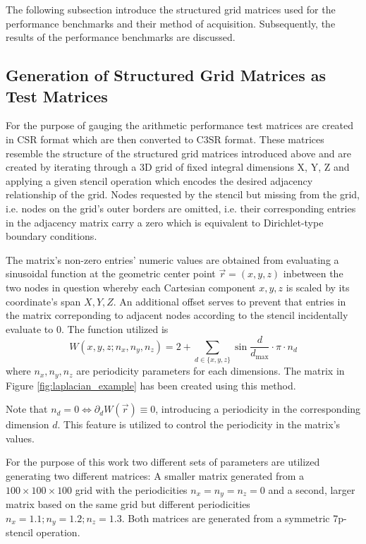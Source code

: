 \documentclass{article}
\begin{document}
  The following subsection introduce the structured grid matrices used for the performance benchmarks and their method of acquisition. Subsequently, the results of the performance benchmarks are discussed.

  \subsection{Generation of Structured Grid Matrices as Test Matrices}

    For the purpose of gauging the arithmetic performance test matrices are created in CSR format which are then converted to C3SR format. These matrices resemble the structure of the structured grid matrices introduced above and are created by iterating through a 3D grid of fixed integral dimensions X, Y, Z and applying a given stencil operation which encodes the desired adjacency relationship of the grid. Nodes requested by the stencil but missing from the grid, i.e.  nodes on the grid's outer borders are omitted, i.e. their corresponding entries in the adjacency matrix carry a zero which is equivalent to Dirichlet-type boundary conditions.

    The matrix's non-zero entries' numeric values are obtained from evaluating a sinusoidal function at the geometric center point $\vec{r} = (x, y, z)$ inbetween the two nodes in question whereby each Cartesian component $x, y, z$ is scaled by its coordinate's span $X, Y, Z$. An additional offset serves to prevent that entries in the matrix correponding to adjacent nodes according to the stencil incidentally evaluate to 0. The function utilized is $$W(x,y,z; n_x, n_y, n_z) = 2 + \sum \limits_{d \in \{x,y,z\}} \sin{\frac{d}{d_{\text{max}}} \cdot \pi \cdot n_d} $$ where $n_x, n_y, n_z$ are periodicity parameters for each dimensions. The matrix in Figure \ref{fig:laplacian_example} has been created using this method.

    Note that $n_d = 0 \Leftrightarrow \partial_d W(\vec{r}) \equiv 0$, introducing a periodicity in the corresponding dimension $d$. This feature is utilized to control the periodicity in the matrix's values.

    For the purpose of this work two different sets of parameters are utilized generating two different matrices: A smaller matrix generated from a $100 \times 100 \times 100$ grid with the periodicities $n_x = n_y = n_z = 0$ and a second, larger matrix based on the same grid but different periodicities $n_x = 1.1; n_y = 1.2; n_z = 1.3$. Both matrices are generated from a symmetric 7p-stencil operation.
\end{document}
